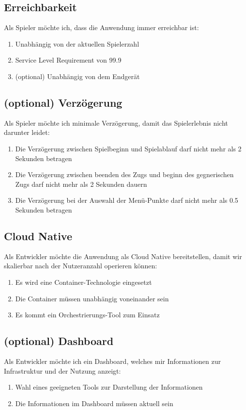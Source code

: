 \documentclass[a4paper, 10pt, conference]{IEEEtran}
\begin{document}
\subsection{Erreichbarkeit}
Als Spieler möchte ich, dass die Anwendung immer erreichbar ist:
\begin{enumerate}
	\item Unabhängig von der aktuellen Spielerzahl
	\item Service Level Requirement von 99.9%
	\item (optional) Unabhängig von dem Endgerät
\end{enumerate}

\subsection{(optional) Verzögerung}
Als Spieler möchte ich minimale Verzögerung, damit das Spielerlebnis nicht darunter leidet:
\begin{enumerate}
	\item Die Verzögerung zwischen Spielbeginn und Spielablauf darf nicht mehr als 2 Sekunden betragen
	\item Die Verzögerung zwischen beenden des Zugs und beginn des gegnerischen Zugs darf nicht mehr als 2 Sekunden dauern
	\item Die Verzögerung bei der Auswahl der Menü-Punkte darf nicht mehr als 0.5 Sekunden betragen
\end{enumerate}

\subsection{Cloud Native}
Als Entwickler möchte die Anwendung als Cloud Native bereitstellen, damit wir skalierbar nach der Nutzeranzahl operieren können:
\begin{enumerate}
	\item Es wird eine Container-Technologie eingesetzt
	\item Die Container müssen unabhängig voneinander sein
	\item Es kommt ein Orchestrierungs-Tool zum Einsatz
\end{enumerate}

\subsection{(optional) Dashboard}
Als Entwickler möchte ich ein Dashboard, welches mir Informationen zur Infrastruktur und der Nutzung anzeigt:
\begin{enumerate}
	\item Wahl eines geeigneten Tools zur Darstellung der Informationen
	\item Die Informationen im Dashboard müssen aktuell sein
\end{enumerate}
\end{document}
